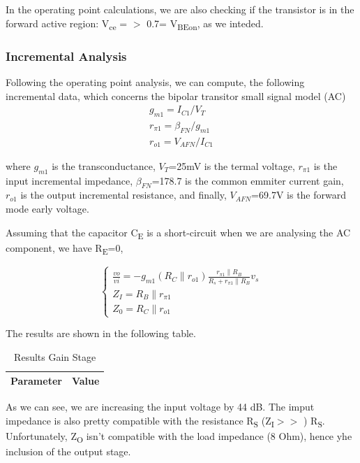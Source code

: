 In the operating point calculations, we are also checking if the transistor is in the forward active region:  V\textsubscript{ce} =  $>$ 0.7= V\textsubscript{BEon}, as we inteded.
\subsubsection{Incremental Analysis}
Following the operating point analysis, we can compute, the following incremental data, which concerns the bipolar transitor small signal model (AC)
\begin{align*} 
g_{m1}= I_{C1}/V_{T}\\
r_{\pi 1}=\beta_{FN}/g_{m1}\\
r_{o 1}=V_{AFN}/I_{C1}
\end{align*}

where $g_{m1}$ is the transconductance, $V_{T}$=25mV is the termal voltage, $r_{\pi 1}$ is the input incremental impedance, $\beta_{FN}$=178.7 is the common emmiter current gain, $r_{o 1}$ is the output incremental resistance, and finally, $V_{AFN}$=69.7V is the forward mode early voltage.


Assuming that the capacitor C\textsubscript{E} is a short-circuit when we are analysing the AC component, we have R\textsubscript{E}=0,

\begin{equation}
\begin{cases} 
\frac{vo}{vi}=-g_{m1} (R_C\parallel r_{o1}) \frac{r_{\pi1} \parallel R_B} {R_s+r_{\pi1}\parallel R_B} v_s \\
Z_I= R_B \parallel r_{\pi1} \\
Z_0=R_C\parallel r_{o1}
\end{cases}
\end{equation}

The results are shown in the following table.

\begin{table}[!htb]
\centering
  \begin{tabular}{|c|c|}
    \hline    
    {\bf Parameter} & {\bf Value} \\ \hline
    
 \end{tabular}
 \caption{Results Gain Stage}\label{tab:gainstage}
\end{table}

As we can see, we are increasing the input voltage by 44 dB. The imput impedance is also pretty compatible with the resistance R\textsubscript S (Z\textsubscript I$>>$ ) R\textsubscript S. Unfortunately, Z\textsubscript O isn't compatible with the load impedance (8 Ohm), hence yhe inclusion of the output stage.

